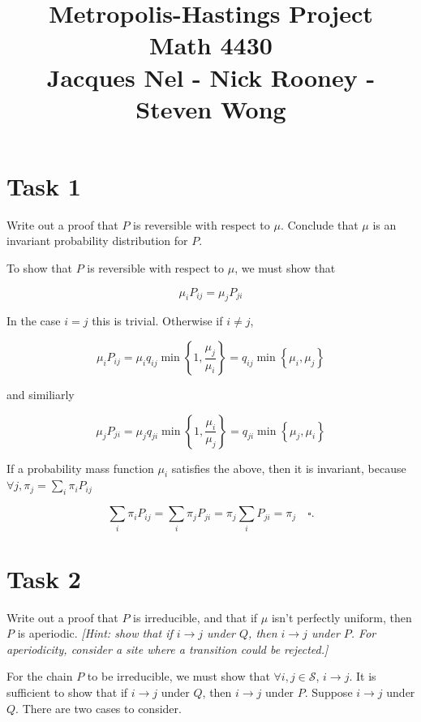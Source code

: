 \documentclass[6pt,oneside]{article}
\title{{\bf Metropolis-Hastings Project\\Math 4430}\\\vspace{10pt}
    Jacques Nel - Nick Rooney - Steven Wong
}
\begin{document}
\maketitle

\section*{Task 1}

Write out a proof that $P$ is reversible with respect to $\mu$. Conclude that $\mu$ is an invariant
probability distribution for $P$.

\vspace{10pt}

To show that $P$ is reversible with respect to $\mu$, we must show that

$$
\mu_iP_{ij} = \mu_jP_{ji}
$$

In the case $i=j$ this is trivial. Otherwise if $i \neq j$,

$$
\mu_i P_{ij} = \mu_iq_{ij} \min\left\lbrace1, \frac{\mu_j}{\mu_i}\right\rbrace
= q_{ij} \min \left\lbrace \mu_i, \mu_j \right\rbrace
$$

and similiarly

$$
\mu_j P_{ji} = \mu_j q_{ji} \min\left\lbrace 1, \frac{\mu_i}{\mu_j}\right\rbrace
=
q_{ji}\min\left\lbrace \mu_j, \mu_i\right\rbrace
$$

If a probability mass function $\mu_i$ satisfies the above, then it is invariant, because
$\forall j, \pi_j=\sum_i \pi_i P_{ij}$

$$
\sum_i \pi_i P_{ij} = \sum_i \pi_j P_{ji} = \pi_j \sum_i P_{ji} = \pi_j
\quad\square.
$$

\section*{Task 2}

Write out a proof that $P$ is irreducible, and that if $\mu$ isn't perfectly uniform, then $P$ is aperiodic.
\emph{[Hint: show that if $i\longrightarrow j$ under $Q$, then $i\longrightarrow j$ under $P$.
For aperiodicity, consider a site where a transition could be rejected.]}

\vspace{10pt}

For the chain $P$ to be irreducible, we must show that $\forall i,j\in\mathcal{S}$, 
$i\longrightarrow j$. It is sufficient to show that if $i\longrightarrow j$ under $Q$,
then $i\longrightarrow j$ under $P$. Suppose $i\longrightarrow j$ under $Q$.
There are two cases to consider.\\
\end{document}
